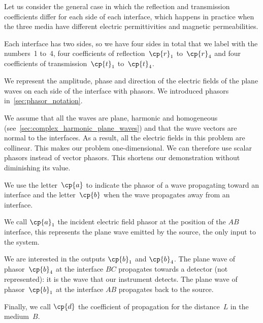 Let us consider the general case in which the reflection and transmission coefficients differ for each side of each interface,
which happens in practice when the three media have different electric permittivities and magnetic permeabilities.

Each interface has two sides, so we have four sides in total that we label with the numbers~1 to~4,
four coefficients of reflection~$\cp{r}_1$ to~$\cp{r}_4$ and
four coefficients of transmission~$\cp{t}_1$ to~$\cp{t}_4$.

We represent the amplitude, phase and direction of the electric fields of the plane waves on each side of the interface with phasors.
We introduced phasors in~\cref{sec:phasor_notation}.

We assume that all the waves are plane, harmonic and homogeneous
(see~\cref{sec:complex_harmonic_plane_waves})
and that the wave vectors are normal to the interfaces.
As a result, all the electric fields in this problem are collinear.
This makes our problem one-dimensional.
We can therefore use scalar phasors instead of vector phasors.
This shortens our demonstration without diminishing its value.

We use the letter~$\cp{a}$ to indicate the phasor of a wave propagating toward an interface and the letter~$\cp{b}$ when the wave propagates away from an interface.

We call $\cp{a}_1$ the incident electric field phasor at the position of the $AB$ interface,
this represents the plane wave emitted by the source, the only input to the system.

We are interested in the outputs $\cp{b}_1$ and $\cp{b}_4$.
The plane wave of phasor~$\cp{b}_4$ at the interface $BC$ propagates towards a detector (not represented): it is the wave that our instrument detects.
The plane wave of phasor~$\cp{b}_1$ at the interface $AB$ propagates back to the source.

Finally, we call $\cp{d}$ the coefficient of propagation for the distance~$L$ in the medium~$B$.

